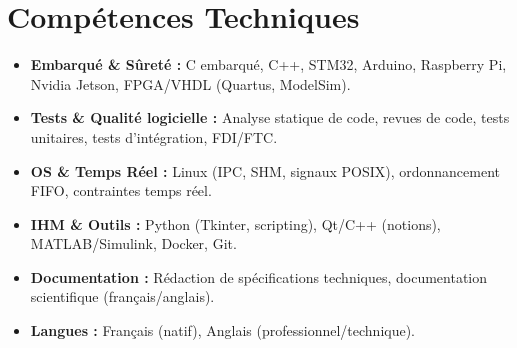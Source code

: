\documentclass[a4paper,11pt]{article}
\begin{document}
\section{Compétences Techniques}
\begin{itemize}[leftmargin=*, nosep]
    \item \small{\textbf{Embarqué \& Sûreté :} C embarqué, C++, STM32, Arduino, Raspberry Pi, Nvidia Jetson, FPGA/VHDL (Quartus, ModelSim).}
    \item \small{\textbf{Tests \& Qualité logicielle :} Analyse statique de code, revues de code, tests unitaires, tests d'intégration, FDI/FTC.}
    \item \small{\textbf{OS \& Temps Réel :} Linux (IPC, SHM, signaux POSIX), ordonnancement FIFO, contraintes temps réel.}
    \item \small{\textbf{IHM \& Outils :} Python (Tkinter, scripting), Qt/C++ (notions), MATLAB/Simulink, Docker, Git.}
    \item \small{\textbf{Documentation :} Rédaction de spécifications techniques, documentation scientifique (français/anglais).}
    \item \small{\textbf{Langues :} Français (natif), Anglais (professionnel/technique).}
\end{itemize}

\end{document}
